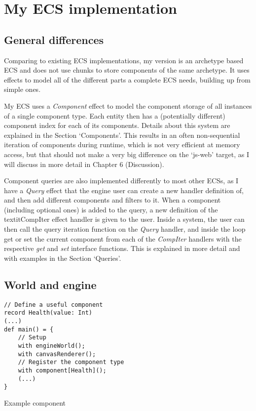 \chapter{My ECS implementation}\label{chap:ecs}

\section{General differences}

Comparing to existing ECS implementations, my version is an archetype based ECS and does not use chunks to store components of the same archetype. It uses effects to model all of the different parts a complete ECS needs, building up from simple ones.

My ECS uses a \textit{Component} effect to model the component storage of all instances of a single component type. Each entity then has a (potentially different) component index for each of its components. Details about this system are explained in the Section `Components'. This results in an often non-sequential iteration of components during runtime, which is not very efficient at memory access, but that should not make a very big difference on the `js-web' target, as I will discuss in more detail in Chapter 6 (Discussion).

Component queries are also implemented differently to most other ECSs, as I have a \textit{Query} effect that the engine user can create a new handler definition of, and then add different components and filters to it. When a component (including optional ones) is added to the query, a new definition of the textit{CompIter} effect handler is given to the user. Inside a system, the user can then call the query iteration function on the \textit{Query} handler, and inside the loop get or set the current component from each of the \textit{CompIter} handlers with the respective \textit{get} and \textit{set} interface functions. This is explained in more detail and with examples in the Section `Queries'.

\section{World and engine}

\begin{listing}
\begin{lstlisting}
// Define a useful component
record Health(value: Int)
(...)
def main() = {
	// Setup
	with engineWorld();
	with canvasRenderer();
	// Register the component type
	with component[Health]();
	(...)
}
\end{lstlisting}
\caption{Example component}
\label{lst:ex-setup-component}
\end{listing}

